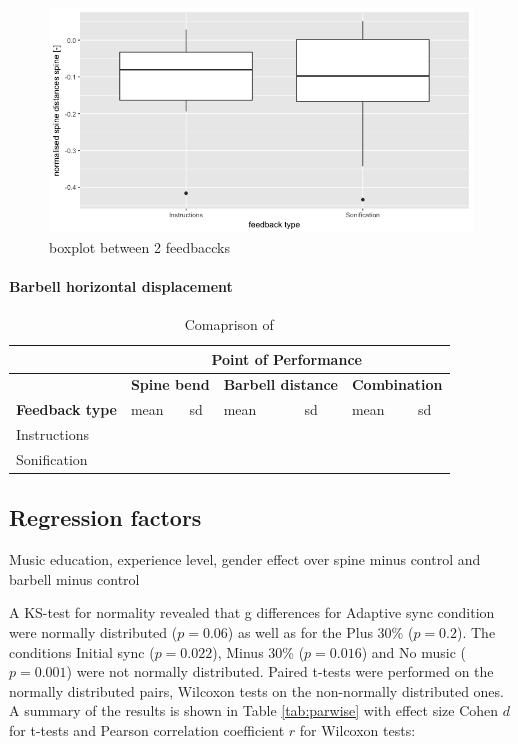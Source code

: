 \documentclass[10pt,letterpaper]{article}
\begin{document}
\begin{figure}[!ht] 
    \includegraphics[width=.45\textwidth]{figures/boxplot.png}
\caption{boxplot between 2 feedbaccks}
\label{fig:boxplot} 
\end{figure}


\paragraph{Barbell horizontal displacement}



\begin{table}[!h]
  \centering
  \caption{Comaprison of }
    \begin{tabular}{|l|r|r|r|r|r|r|}
    \hline
          & \multicolumn{6}{c|}{\bf Point of Performance} \\
   \hline
          & \multicolumn{2}{c|}{\bf Spine bend} & \multicolumn{2}{c|}{ \bf Barbell distance} & \multicolumn{2}{c|}{\bf Combination} \\
     \hline
   \bf Feedback type & \multicolumn{1}{l|}{mean} & \multicolumn{1}{l|}{sd} & \multicolumn{1}{l|}{mean} & \multicolumn{1}{l|}{sd} & \multicolumn{1}{l|}{mean} & \multicolumn{1}{l|}{sd} \\
    \hline
    Instructions &       &       &       &       &       &  \\
    \hline
    Sonification &       &       &       &       &       &  \\
     \hline
    \end{tabular}%
  \label{tab:addlabel}%
\end{table}%





\subsection*{Regression factors}

Music education, experience level, gender effect over spine  minus control and barbell  minus control

A KS-test for normality revealed that g differences for Adaptive sync condition were normally distributed ($p=0.06$) as well as for the  Plus 30\% ($p=0.2$). The conditions Initial sync ($p=0.022$), Minus 30\% ($p=0.016$) and No music ($p=0.001$) were not normally distributed. 
Paired t-tests were performed on the normally distributed pairs, Wilcoxon tests on the non-normally distributed ones. A summary of the results is shown in Table \ref{tab:parwise} with effect size Cohen $d$ for t-tests and Pearson correlation coefficient $r$ for Wilcoxon tests:
\end{document}
